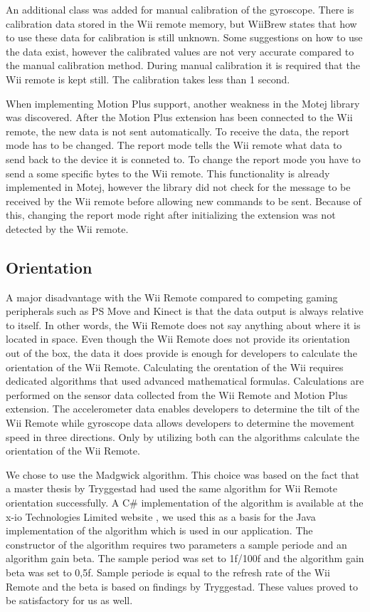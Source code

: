 An additional class was added for manual calibration of the gyroscope. There is calibration data stored in the Wii remote memory, but WiiBrew states that how to use these data for calibration is still unknown. Some suggestions on how to use the data exist, however the calibrated values are not very accurate compared to the manual calibration method. During manual calibration it is required that the Wii remote is kept still. The calibration takes less than 1 second.


When implementing Motion Plus support, another weakness in the Motej library was discovered. After the Motion Plus extension has been connected to the Wii remote, the new data is not sent automatically. To receive the data, the report mode has to be changed. The report mode tells the Wii remote what data to send back to the device it is conneted to. To change the report mode you have to send a some specific bytes to the Wii remote. This functionality is already implemented in Motej, however the library did not check for the message to be received by the Wii remote before allowing new commands to be sent. Because of this, changing the report mode right after initializing the extension was not detected by the Wii remote. 

\subsection{Orientation}
A major disadvantage with the Wii Remote compared to competing gaming peripherals such as PS Move and Kinect is that the data output is always relative to itself. In other words, the Wii Remote does not say anything about where it is located in space. Even though the Wii Remote does not provide its orientation out of the box, the data it does provide is enough for developers to calculate the orientation of the Wii Remote. Calculating the orentation of the Wii requires dedicated algorithms that used advanced mathematical formulas. Calculations are performed on the sensor data collected from the Wii Remote and Motion Plus extension. The accelerometer data enables developers to determine the tilt of the Wii Remote while gyroscope data allows developers to determine the movement speed in three directions. Only by utilizing both can the algorithms calculate the orientation of the Wii Remote.

We chose to use the Madgwick algorithm\cite{madgwick}. This choice was based on the fact that a master thesis by Tryggestad\cite{Tryggestad} had used the same algorithm for Wii Remote orientation successfully. A C\# implementation of the algorithm is available at the x-io Technologies Limited website \cite{opensourceMadgwick}, we used this as a basis for the Java implementation of the algorithm which is used in our application. The constructor of the algorithm requires two parameters a sample periode and an algorithm gain beta. The sample period was set to 1f/100f and the algorithm gain beta was set to 0,5f. Sample periode is equal to the refresh rate of the Wii Remote and the beta is based on findings by Tryggestad. These values proved to be satisfactory for us as well.

